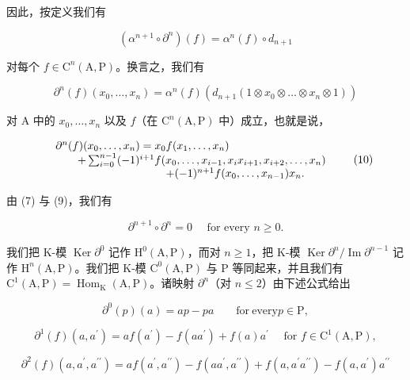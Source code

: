 因此，按定义我们有

\[
(\alpha^ {n + 1} \circ \partial^ {n}) (f) = \alpha^ {n} (f) \circ d _ {n + 1}\tag{9}
\]

对每个 \(f \in \mathrm{C}^n(\mathrm{A},\mathrm{P})\)。换言之，我们有

\[
\partial^ {n} (f) \left(x _ {0}, \dots , x _ {n}\right) = \alpha^ {n} (f) \left(d _ {n + 1} \left(1 \otimes x _ {0} \otimes \dots \otimes x _ {n} \otimes 1\right)\right)
\]

对 A 中的 \(x_0, \ldots, x_n\) 以及 \(f\)（在 \(\mathrm{C}^n(\mathrm{A}, \mathrm{P})\) 中）成立，也就是说，

\[
\begin{array}{r l} & {\partial^ {n} (f) (x _ {0}, \ldots , x _ {n}) = x _ {0} f (x _ {1}, \ldots , x _ {n})} \\ & {\qquad + \sum_ {i = 0} ^ {n - 1} (- 1) ^ {i + 1} f (x _ {0}, \ldots , x _ {i - 1}, x _ {i} x _ {i + 1}, x _ {i + 2}, \ldots , x _ {n})} \\ & {\qquad \qquad \qquad \qquad \qquad + (- 1) ^ {n + 1} f (x _ {0}, \ldots , x _ {n - 1}) x _ {n}.} \end{array}\tag{10}
\]

由 (7) 与 (9)，我们有

\[
\partial^ {n + 1} \circ \partial^ {n} = 0 \quad \text {   for   every   } n \geqslant 0.\tag{11}
\]

我们把 K-模 \(\operatorname{Ker} \partial^0\) 记作 \(\mathrm{H}^0(\mathrm{A},\mathrm{P})\)，而对 \(n \geqslant 1\)，把 K-模 \(\operatorname{Ker} \partial^n/\operatorname{Im} \partial^{n-1}\) 记作 \(\mathrm{H}^n(\mathrm{A},\mathrm{P})\)。我们把 K-模 \(\mathrm{C}^0(\mathrm{A},\mathrm{P})\) 与 \(\mathrm{P}\) 等同起来，并且我们有 \(\mathrm{C}^1(\mathrm{A},\mathrm{P}) = \operatorname{Hom}_\mathrm{K}(\mathrm{A},\mathrm{P})\)。诸映射 \(\partial^n\)（对 \(n \leqslant 2\)）由下述公式给出

\[
\partial^ {0} (p) (a) = a p - p a \qquad \mathrm{for\ every} p \in \mathrm{P},\tag{12}
\]

\[
\partial^ {1} (f) \left(a, a ^ {\prime}\right) = a f \left(a ^ {\prime}\right) - f \left(a a ^ {\prime}\right) + f (a) a ^ {\prime} \quad \text { for } f \in \mathrm{C} ^ {1} (\mathrm{A}, \mathrm{P}),\tag{13}
\]

\[
\partial^ {2} (f) \left(a, a ^ {\prime}, a ^ {\prime \prime}\right) = a f \left(a ^ {\prime}, a ^ {\prime \prime}\right) - f \left(a a ^ {\prime}, a ^ {\prime \prime}\right) + f \left(a, a ^ {\prime} a ^ {\prime \prime}\right) - f \left(a, a ^ {\prime}\right) a ^ {\prime \prime}\tag{14}
\]

